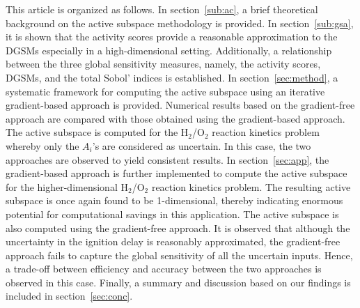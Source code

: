 This article is organized as follows. In section~\ref{sub:ac}, a brief
theoretical background on the active subspace methodology is provided. In
section~\ref{sub:gsa}, it is shown that the activity scores provide a
reasonable approximation to the DGSMs especially in a high-dimensional setting.
Additionally, a relationship between the three global sensitivity measures,
namely, the activity scores, DGSMs, and the total Sobol' indices is
established. In section~\ref{sec:method}, a systematic framework for computing
the active subspace using an iterative gradient-based approach is provided.
Numerical results based on the gradient-free approach are compared with those
obtained using the gradient-based approach.  The active subspace is computed
for the H$_2$/O$_2$ reaction kinetics problem whereby only the $A_i$'s are
considered as uncertain. In this case, the two approaches are observed to yield
consistent results. In section~\ref{sec:app}, the gradient-based approach is
further implemented to compute the active subspace for the higher-dimensional
H$_2$/O$_2$ reaction kinetics problem. The resulting active subspace is once again
found to be 1-dimensional, thereby indicating enormous potential for computational
savings in this application. The active subspace is also computed using the
gradient-free approach. It is observed that although the uncertainty in the
ignition delay is reasonably approximated, the gradient-free approach fails to
capture the global sensitivity of all the uncertain inputs. Hence, a trade-off
between efficiency and accuracy between the two approaches is observed in this
case.  Finally, a summary and discussion based on our findings is included in
section~\ref{sec:conc}.










 




